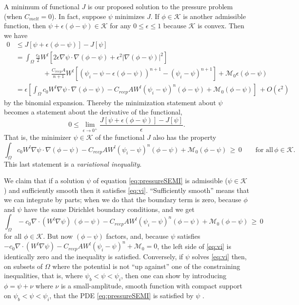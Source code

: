 \documentclass[11pt]{amsart}
\newcommand{\eps}{\epsilon}
\newcommand{\Cmelt}{C_{melt}}
\newcommand{\Creep}{C_{reep}}
\begin{document}
A minimum of functional $J$ is our proposed solution to the pressure problem (when $\Cmelt=0$).  In fact, suppose $\psi$ minimizes $J$.  If $\phi \in \mathcal{K}$ is another admissible function, then $\psi + \epsilon (\phi - \psi) \in \mathcal{K}$ for any $0\le \epsilon \le 1$ because $\mathcal{K}$ is convex.  Then we have
\begin{align*}
0 &\le J[\psi+\epsilon(\phi-\psi)] - J[\psi] \\
   &= \int_\Omega \frac{c_0}{2} W^l \left[2 \epsilon \nabla \psi \cdot \nabla (\phi-\psi) + \epsilon^2 |\nabla (\phi-\psi)|^2\right] \\
   &\qquad\qquad + \frac{\Creep A }{n+1} W^l \left[\left(\psi_i - \psi - \epsilon(\phi-\psi)\right)^{n+1} - \left(\psi_i - \psi\right)^{n+1}\right] + \mathcal{M}_0 \epsilon (\phi - \psi)  \\
   &= \epsilon \left[\int_\Omega c_0 W^l \nabla \psi \cdot \nabla (\phi-\psi) - \Creep A W^l (\psi_i - \psi)^n (\phi-\psi) + \mathcal{M}_0(\phi - \psi)\right] \, + O(\epsilon^2)
\end{align*}
by the binomial expansion.  Thereby the minimization statement about $\psi$ becomes a statement about the derivative of the functional,
	$$0 \le \lim_{\eps\to 0^+} \frac{J[\psi+\epsilon(\phi-\psi)] - J[\psi]}{\epsilon}.$$
That is, the minimizer $\psi \in \mathcal{K}$ of the functional $J$ also has the property
\begin{equation}\label{eq:vi}
\int_\Omega c_0 W^l \nabla \psi \cdot \nabla (\phi-\psi) - \Creep A W^l (\psi_i - \psi)^n (\phi-\psi) + \mathcal{M}_0(\phi - \psi)\, \ge\, 0 \qquad \text{for all}\,\phi\in\mathcal{K}.
\end{equation}
This last statement is a \emph{variational inequality}.

We claim that if a solution $\psi$ of equation \eqref{eq:pressureSEMI} is admissible ($\psi \in \mathcal{K}$) and sufficiently smooth then it satisfies \eqref{eq:vi}.  ``Sufficiently smooth'' means that we can integrate by parts; when we do that the boundary term is zero, because $\phi$ and $\psi$ have the same Dirichlet boundary conditions, and we get
	$$\int_\Omega - c_0 \nabla \cdot \left(W^l \nabla \psi\right) \,(\phi-\psi) - \Creep A W^l (\psi_i - \psi)^n (\phi-\psi) + \mathcal{M}_0(\phi - \psi)\, \ge\, 0$$
for all $\phi\in\mathcal{K}$.  But now $(\phi - \psi)$ factors, and, because $\psi$ satisfies $- c_0 \nabla \cdot \left(W^l \nabla \psi\right) - \Creep A W^l (\psi_i - \psi)^n + \mathcal{M}_0=0$, the left side of \eqref{eq:vi} is identically zero and the inequality is satisfied.  Conversely, if $\psi$ solves \eqref{eq:vi} then, on subsets of $\Omega$ where the potential is not ``up against'' one of the constraining inequalities, that is, where $\psi_b < \psi < \psi_i$, then one can show by introducing $\phi=\psi+\nu$ where $\nu$ is a small-amplitude, smooth function with compact support on $\psi_b < \psi < \psi_i$, that the PDE \eqref{eq:pressureSEMI} is satisfied by $\psi$ \citep[page 469]{Evans}.
\end{document}
